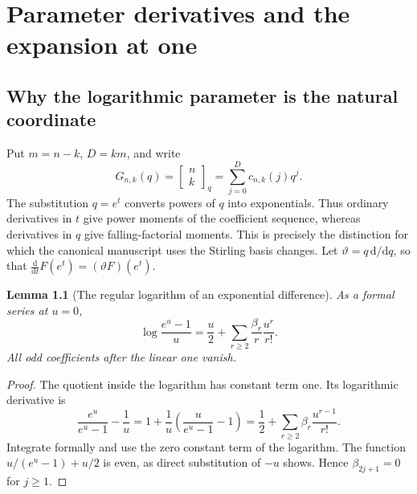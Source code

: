\documentclass[11pt,a4paper,oneside,openany]{book}
\newtheorem{lemma}[theorem]{Lemma}
\theoremstyle{definition}
\theoremstyle{remark}
\newcommand{\GB}[3][q]{\begin{bmatrix}#2\\#3\end{bmatrix}_{#1}}
\newcommand{\logq}{\vartheta}
\begin{document}
\chapter{Parameter derivatives and the expansion at one}
\label{q1:qcc:parameter-jets}
\section{Why the logarithmic parameter is the natural coordinate}
Put \(m=n-k\), \(D=km\), and write
\[
 G_{n,k}(q)=\GB nk=\sum_{j=0}^{D}c_{n,k}(j)q^j.
\]
The substitution \(q=e^t\) converts powers of \(q\) into exponentials. Thus
ordinary derivatives in \(t\) give power moments of the coefficient sequence,
whereas derivatives in \(q\) give falling-factorial moments. This is precisely
the distinction for which the canonical manuscript uses the Stirling basis changes.
Let \(\logq=q\,\mathrm d/\mathrm dq\), so that
\(\frac{\mathrm d}{\mathrm dt}F(e^t)=(\logq F)(e^t)\).

\begin{lemma}[The regular logarithm of an exponential difference]
\label{q1:qcc:regular-log}
As a formal series at \(u=0\),
\begin{equation}\label{q1:qcc:regular-log-eq}
 \log\frac{e^u-1}{u}
 =\frac u2+\sum_{r\ge2}\frac{\beta_r}{r}\frac{u^r}{r!}.
\end{equation}
All odd coefficients after the linear one vanish.
\end{lemma}
\begin{proof}
The quotient inside the logarithm has constant term one. Its logarithmic
 derivative is
\[
 \frac{e^u}{e^u-1}-\frac1u
 =1+\frac1u\left(\frac{u}{e^u-1}-1\right)
 =\frac12+\sum_{r\ge2}\beta_r\frac{u^{r-1}}{r!}.
\]
Integrate formally and use the zero constant term of the logarithm. The function
\(u/(e^u-1)+u/2\) is even, as direct substitution of \(-u\) shows. Hence
\(\beta_{2j+1}=0\) for \(j\ge1\).
\end{proof}
\end{document}
